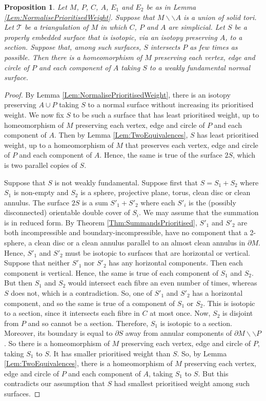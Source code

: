 \documentclass[oneside]{amsart}
\numberwithin{equation}{section}
\theoremstyle{plain}
\newtheorem{proposition}[equation]{Proposition}
\theoremstyle{definition}
\newcommand{\cut}{\backslash\backslash}
\begin{document}
\begin{proposition}
\label{Prop:SectionCircleBundle}
Let $M$, $P$, $C$, $A$, $E_1$ and $E_2$ be as in Lemma \ref{Lem:NormalisePrioritisedWeight}.
Suppose that $M \cut A$ is a union of solid tori.
Let $\mathcal{T}$ be a triangulation of $M$ in which $C$, $P$ and $A$ are simplicial. 
Let $S$ be a properly embedded surface that is isotopic, via an isotopy preserving $A$, to a section.
Suppose that, among such surfaces, $S$ intersects $P$ as few times as possible.
Then there is a homeomorphism of $M$ preserving each vertex, edge and circle of $P$ and each component of $A$ 
taking $S$ to a weakly fundamental normal surface.
\end{proposition}

\begin{proof}
By Lemma \ref{Lem:NormalisePrioritisedWeight}, there is an isotopy preserving
$A \cup P$ taking $S$ to a normal surface without increasing its prioritised weight. 
We now fix $S$ to be such a surface that has least prioritised weight,
up to homeomorphism of $M$ preserving each vertex, edge and circle of $P$ and each component of $A$. Then by Lemma \ref{Lem:TwoEquivalences},
$S$ has least prioritised weight, up to a homeomorphism of $M$ that preserves each vertex, edge and circle of $P$
and each component of $A$. Hence,
the same is true of the surface $2S$, which is two parallel copies of $S$.

Suppose that $S$ is not weakly fundamental. Suppose first that $S = S_1 + S_2$ where 
$S_1$ is non-empty and $S_2$ is a sphere, projective plane, torus, clean disc
or clean annulus.
The surface $2S$ is a sum $S'_1 + S'_2$ where each $S'_i$ is the (possibly disconnected)
orientable double cover of $S_i$. We may assume that the summation is in reduced form.
By Theorem \ref{Thm:SummandsPrioritised}, $S'_1$ and $S'_2$ are both incompressible and boundary-incompressible,
have no component that a 2-sphere, a clean disc or a clean annulus parallel to an almost clean annulus in $\partial M$. 
Hence, $S'_1$ and $S'_2$ must be isotopic to surfaces that are horizontal or vertical.
Suppose that neither $S'_1$ nor $S'_2$ has
any horizontal components. Then each component is vertical.
Hence, the same is true of each component of $S_1$ and $S_2$. But then $S_1$ and $S_2$ 
would intersect each fibre an even number of times, whereas $S$ does not, which 
is a contradiction. So, one of $S'_1$ and $S'_2$ has a horizontal component, and so the same is
true of a component of $S_1$ or $S_2$. This is isotopic to a section, since it intersects each fibre in $C$ at most once.
Now, $S_2$ is disjoint from $P$ and so cannot be a section. Therefore, $S_1$ is isotopic to a section.
Moreover, its boundary is equal to $\partial S$ away from annular components of $\partial M \cut P$. So 
there is a homeomorphism of $M$ preserving  each vertex, edge and circle of $P$,
taking $S_1$ to $S$. It has smaller prioritised weight than $S$. So, by Lemma \ref{Lem:TwoEquivalences},
there is a homeomorphism of $M$ preserving  each vertex, edge and circle of $P$ and each component of $A$,
taking $S_1$ to $S$. But this contradicts our assumption that $S$ had smallest prioritised weight
among such surfaces.


\end{proof}
\end{document}
